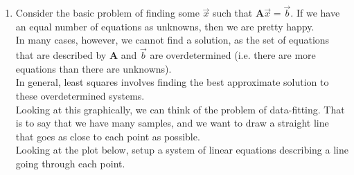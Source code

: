 


\begin{enumerate}
\item{Consider the basic problem of finding some $\vec{x}$ such that $\mathbf{A}\vec{x} = \vec{b}$. If we have an equal number of equations as unknowns, then we are pretty happy.\\

In many cases, however, we cannot find a solution, as the set of equations that are described by $\mathbf{A}$ and $\vec{b}$ are overdetermined (i.e. there are more equations than there are unknowns).\\

In general, least squares involves finding the best approximate solution to these overdetermined systems.\\
    
Looking at this graphically, we can think of the problem of data-fitting. That is to say that we have many samples, and we want to draw a straight line that goes as close to each point as possible.\\

Looking at the plot below, setup a system of linear equations describing a line going through each point.\\

\begin{center}
\end{center}
}
    
\end{enumerate}
